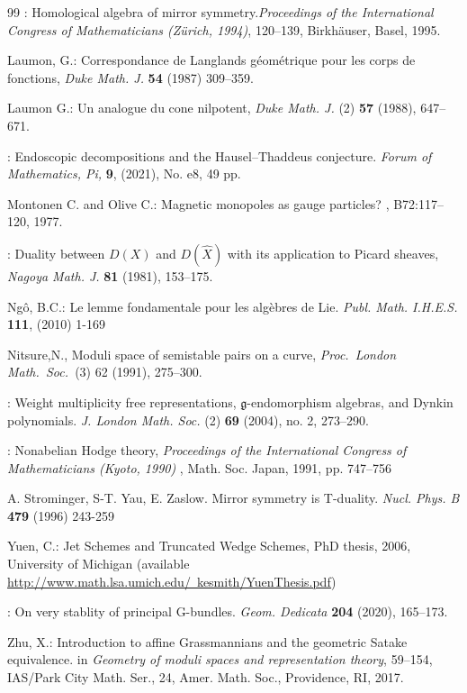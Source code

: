 \begin{thebibliography}{99}
: Homological algebra of mirror symmetry.{\em  Proceedings of the International Congress of Mathematicians (Z\"urich, 1994)}, 120--139, Birkh\"auser, Basel, 1995.
	
		 { Laumon, G.}: Correspondance de Langlands g\'eom\'etrique pour les corps de fonctions, {\em Duke Math. J.} {\bf 54}
(1987) 309--359.
	
	 { Laumon G.}: Un analogue du cone nilpotent,
{\em Duke Math. J.} (2) {\bf 57} (1988), 647--671. 

	
	
	: Endoscopic decompositions and the Hausel--Thaddeus conjecture. {\em Forum of Mathematics, Pi,} {\bf 9}, (2021),  No. e8, 49 pp. 	%
	
Montonen C. and Olive C.:
\newblock Magnetic monopoles as gauge particles?
, B72:117--120, 1977.
	
	:
	Duality between $D(X)$ and $D(\hat{X} )$ with its application to Picard sheaves,
	{\em Nagoya Math. J.} {\bf 81} (1981), 153--175.
	
	 { Ng\^o, B.C.}: Le lemme fondamentale pour les algèbres de Lie. {\em 
		Publ. Math. I.H.E.S.} {\bf 111}, (2010) 1-169
	
{  Nitsure,N.},
Moduli space of semistable pairs on a curve,
{\em Proc.\ London Math.\ Soc.\ }(3) 62 (1991), 275--300.
	
	:
	Weight multiplicity free representations, {$\mathfrak g$}-endomorphism algebras, and Dynkin polynomials.
	{\em 	J. London Math. Soc.} (2) {\bf 69 }(2004), no. 2, 273--290.
	
		
	: Nonabelian Hodge theory, {\em Proceedings of the International Congress of Mathematicians (Kyoto, 1990)} , Math. Soc. Japan, 1991, pp. 747–756
	
	 A. Strominger, S-T. Yau, E. Zaslow. 
	Mirror symmetry is T-duality. {\em Nucl. Phys. B} {\bf 479} (1996) 243-259
	
	 { Yuen, C.}: Jet Schemes and Truncated Wedge Schemes, PhD thesis, 2006, University of Michigan (available \href{http://www.math.lsa.umich.edu/~kesmith/YuenThesis.pdf}{http://www.math.lsa.umich.edu/~kesmith/YuenThesis.pdf})
	
	:
	On very stablity of principal G-bundles. 
	{\em 	Geom. Dedicata} {\bf 204} (2020), 165--173.

 Zhu, X.: Introduction to affine Grassmannians and the geometric Satake equivalence. {in {\em Geometry of moduli spaces and representation theory}}, 59--154, IAS/Park City Math. Ser., 24, Amer. Math. Soc., Providence, RI, 2017.

\end{thebibliography}

